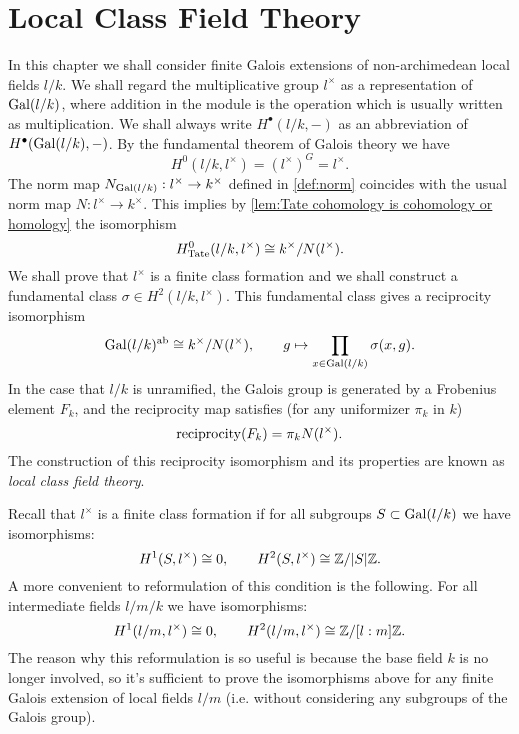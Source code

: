 \chapter{Local Class Field Theory}

In this chapter we shall consider finite Galois extensions of non-archimedean local fields $l/k$.
We shall regard the multiplicative group $l^\times$ as a representation of $\mathrm{Gal}(l/k)$, where
addition in the module is the operation which is usually written as multiplication.
We shall always write $H^\bullet(l/k,-)$ as an abbreviation of $H^\bullet(\mathrm{Gal}(l/k),-)$.
By the fundamental theorem of Galois theory we have
\[
	H^0(l/k,l^\times) = (l^\times)^G = l^\times.
\]
The norm map $N_{\mathrm{Gal}(l/k)} : l^\times \to k^\times$ defined in \ref{def:norm}
coincides with the usual norm map $N : l^\times \to k^\times$. This implies by
\ref{lem:Tate cohomology is cohomology or homology} the isomorphism
\[
	H^0_{\mathrm{Tate}}(l/k,l^\times) \cong k^\times / N(l^\times).
\]
We shall prove that $l^\times$ is a finite class formation and we shall construct a
fundamental class $\sigma \in H^2(l/k, l^\times)$.
This fundamental class gives a reciprocity isomorphism
\[
	\mathrm{Gal}(l/k)^{\mathrm{ab}}
	\cong
	k^\times / N(l^\times), \qquad
	g \mapsto \prod_{x \in \mathrm{Gal}(l/k)} \sigma(x,g).
\]
In the case that $l/k$ is unramified, the Galois group is generated by a Frobenius element $F_k$,
and the reciprocity map satisfies (for any uniformizer $\pi_k$ in $k$)
\[
	\mathrm{reciprocity}(F_k) = \pi_k N(l^\times).
\]
The construction of this reciprocity isomorphism and its properties are known as
\emph{local class field theory}.

Recall that $l^\times$ is a finite class formation if for all subgroups $S \subset \mathrm{Gal}(l/k)$
we have isomorphisms:
\[
	H^1(S,l^\times) \cong 0, \qquad H^2(S,l^\times) \cong {\mathbb Z} / |S| {\mathbb Z}.
\]
A more convenient to reformulation of this condition is the following.
For all intermediate fields $l / m / k$ we have isomorphisms:
\[
	H^1(l/m,l^\times) \cong 0, \qquad H^2(l/m,l^\times) \cong {\mathbb Z} / [l:m] {\mathbb Z}.
\]
The reason why this reformulation is so useful is because the base field $k$ is no longer involved,
so it's sufficient to prove the isomorphisms above for any finite Galois extension of local fields $l/m$
(i.e. without considering any subgroups of the Galois group).

